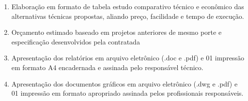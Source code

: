 \begin{enumerate}
\begin{enumerate}
			\item Elaboração em formato de tabela estudo comparativo técnico e econômico das alternativas técnicas propostas, aliando preço, facilidade e tempo de execução.
			
			\item Orçamento estimado baseado em projetos anteriores de mesmo porte e especificação desenvolvidos pela contratada
			
			\item Apresentação dos relatórios em arquivo eletrônico (.doc e .pdf) e 01 impressão em formato A4 encadernada e assinada pelo responsável técnico.
			
			\item Apresentação dos documentos gráficos em arquivo eletrônico (.dwg e .pdf) e 01 impressão em formato apropriado assinada pelos profissionais responsáveis.

		\end{enumerate}
	
\end{enumerate}
